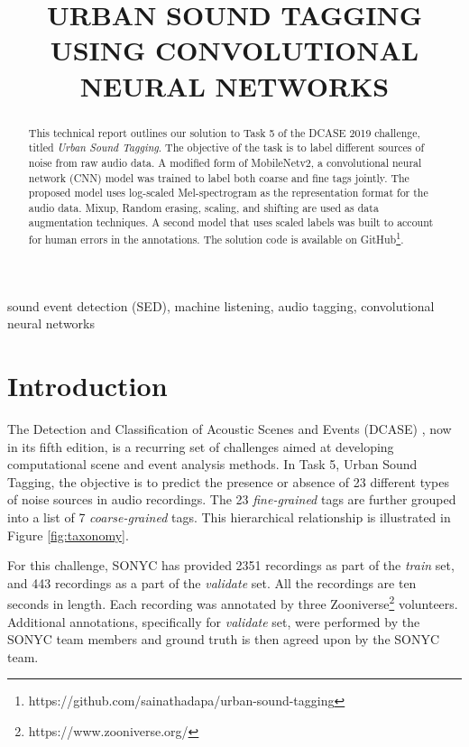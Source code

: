 \documentclass{article}
\title{URBAN SOUND TAGGING USING CONVOLUTIONAL NEURAL NETWORKS}
\begin{document}
\ninept
\maketitle

\begin{sloppy}

\begin{abstract}
This technical report outlines our solution to Task 5 of the DCASE 2019 challenge, titled \textit{Urban Sound Tagging}. The objective of the task is to label different sources of noise from raw audio data. A modified form of MobileNetv2, a convolutional neural network (CNN) model was trained to label both coarse and fine tags jointly. The proposed model uses log-scaled Mel-spectrogram as the representation format for the audio data. Mixup, Random erasing, scaling, and shifting are used as data augmentation techniques. A second model that uses scaled labels was built to account for human errors in the annotations. The solution code is available on GitHub\footnote{https://github.com/sainathadapa/urban-sound-tagging}.
\end{abstract}

\begin{keywords}
sound event detection (SED), machine listening, audio tagging, convolutional neural networks
\end{keywords}

\section{Introduction}
\label{sec:intro}

The Detection and Classification of Acoustic Scenes and Events (DCASE) \cite{dcase2019web}, now in its fifth edition, is a recurring set of challenges aimed at developing computational scene and event analysis methods. In Task 5, Urban Sound Tagging, the objective is to predict the presence or absence of 23 different types of noise sources in audio recordings. The 23 \textit{fine-grained} tags are further grouped into a list of 7 \textit{coarse-grained} tags. This hierarchical relationship is illustrated in Figure \ref{fig:taxonomy}.

For this challenge, SONYC \cite{bello2018sonyc} has provided 2351 recordings as part of the \textit{train} set, and 443 recordings as a part of the \textit{validate} set. All the recordings are ten seconds in length. Each recording was annotated by three Zooniverse\footnote{https://www.zooniverse.org/} volunteers. Additional annotations, specifically for \textit{validate} set, were performed by the SONYC team members and ground truth is then agreed upon by the SONYC team.


\end{sloppy}
\end{document}
